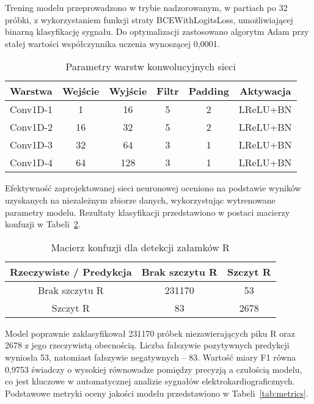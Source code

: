\documentclass[journal]{IEEEtran}
\begin{document}
Trening modelu przeprowadzono w trybie nadzorowanym, w partiach po 32 próbki, z wykorzystaniem funkcji straty BCEWithLogitsLoss, umożliwiającej binarną klasyfikację sygnału. Do optymalizacji zastosowano algorytm Adam przy stałej wartości współczynnika uczenia wynoszącej 0,0001.

\begin{table}[h!]
\centering
\caption{Parametry warstw konwolucyjnych sieci}
\label{tab:conv_layers}
\begin{tabular}{|l|c|c|c|c|c|}
\hline
\textbf{Warstwa} & \textbf{Wejście} & \textbf{Wyjście} & \textbf{Filtr} & \textbf{Padding} & \textbf{Aktywacja} \\
\hline
Conv1D-1 & 1   & 16  & 5 & 2 & LReLU+BN \\
Conv1D-2 & 16  & 32  & 5 & 2 & LReLU+BN \\
Conv1D-3 & 32  & 64  & 3 & 1 & LReLU+BN \\
Conv1D-4 & 64  & 128 & 3 & 1 & LReLU+BN \\
\hline
\end{tabular}
\end{table}

Efektywność zaprojektowanej sieci neuronowej oceniono na podstawie wyników uzyskanych na niezależnym zbiorze danych, wykorzystując wytrenowane parametry modelu. Rezultaty klasyfikacji przedstawiono w postaci macierzy konfuzji w Tabeli~\ref{tab:conf_matrix}.

\begin{table}[ht]
\centering
\caption{Macierz konfuzji dla detekcji załamków R}
\label{tab:conf_matrix}
\begin{tabular}{|c|c|c|}
\hline
\textbf{Rzeczywiste / Predykcja} & \textbf{Brak szczytu R} & \textbf{Szczyt R} \\
\hline
Brak szczytu R & 231170 & 53 \\
\hline
Szczyt R & 83 & 2678 \\
\hline
\end{tabular}
\end{table}

\newpage
Model poprawnie zaklasyfikował 231170 próbek niezawierających piku R oraz 2678 z jego rzeczywistą obecnością. Liczba fałszywie pozytywnych predykcji wyniosła 53, natomiast fałszywie negatywnych -- 83. Wartość miary F1 równa 0,9753 świadczy o wysokiej równowadze pomiędzy precyzją a czułością modelu, co jest kluczowe w automatycznej analizie sygnałów elektrokardiograficznych. Podstawowe metryki oceny jakości modelu przedstawiono w Tabeli~\ref{tab:metrics}.
\end{document}
